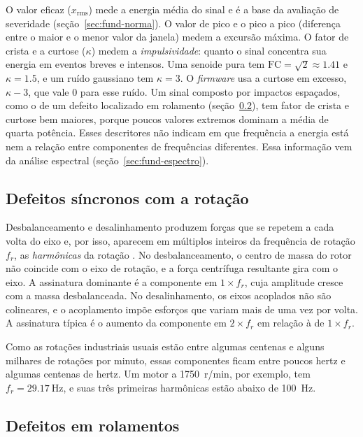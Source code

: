 O valor eficaz ($x_{\mathrm{rms}}$) mede a energia média do sinal e é a base da avaliação de severidade
(seção~\ref{sec:fund-norma}). O valor de pico e o pico a pico (diferença entre o maior e o menor valor da
janela) medem a excursão máxima. O fator de crista e a curtose ($\kappa$) medem a \emph{impulsividade}:
quanto o sinal concentra sua energia em eventos breves e intensos. Uma senoide pura tem
$\mathrm{FC} = \sqrt{2} \approx \num{1,41}$ e $\kappa = \num{1,5}$, e um ruído gaussiano tem $\kappa = 3$.
O \emph{firmware} usa a curtose em excesso, $\kappa - 3$, que vale 0 para esse ruído. Um sinal composto por
impactos espaçados, como o de um defeito localizado em rolamento (seção~\ref{sec:fund-rolamento}), tem fator
de crista e curtose bem maiores, porque poucos valores extremos dominam a média de quarta potência. Esses
descritores não indicam em que frequência a energia está nem a relação entre componentes de frequências
diferentes. Essa informação vem da análise espectral (seção~\ref{sec:fund-espectro}).

\subsection{Defeitos síncronos com a rotação}

Desbalanceamento e desalinhamento produzem forças que se repetem a cada volta do eixo e, por isso, aparecem
em múltiplos inteiros da frequência de rotação $f_r$, as \emph{harmônicas} da rotação
\cite{randall2011livro}. No desbalanceamento, o centro de massa do rotor não coincide com o eixo de rotação,
e a força centrífuga resultante gira com o eixo. A assinatura dominante é a componente em $1\times f_r$, cuja
amplitude cresce com a massa desbalanceada. No desalinhamento, os eixos acoplados não são colineares, e o
acoplamento impõe esforços que variam mais de uma vez por volta. A assinatura típica é o aumento da componente
em $2\times f_r$ em relação à de $1\times f_r$.

Como as rotações industriais usuais estão entre algumas centenas e alguns milhares de rotações por minuto,
essas componentes ficam entre poucos hertz e algumas centenas de hertz. Um motor a \SI{1750}{r/min}, por
exemplo, tem $f_r = \SI{29,17}{\hertz}$, e suas três primeiras harmônicas estão abaixo de \SI{100}{\hertz}.

\subsection{Defeitos em rolamentos}
\label{sec:fund-rolamento}

